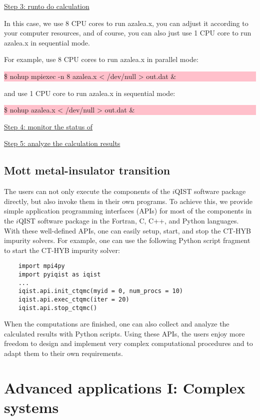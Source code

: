 \underline{Step 3: run\azalea to do calculation}

In this case, we use 8 CPU cores to run azalea.x, you can adjust it according to your computer resources, and of course, you can also just use 1 CPU core to run azalea.x in sequential mode.

For example, use 8 CPU cores to run azalea.x in parallel mode:

\noindent\colorbox{pink}{\parbox[r]{\linewidth}{\quad \$ nohup mpiexec -n 8 azalea.x < /dev/null > out.dat \&}}

and use 1 CPU core to run azalea.x in sequential mode:

\noindent\colorbox{pink}{\parbox[r]{\linewidth}{\quad \$ nohup azalea.x < /dev/null > out.dat \&}}

\underline{Step 4: monitor the status of\azalea}

\underline{Step 5: analyze the calculation results}


\subsection{Mott metal-insulator transition}
The users can not only execute the components of the $i$QIST software package directly, but also invoke them in their own programs. To achieve this, we provide simple application programming interfaces (APIs) for most of the components in the $i$QIST software package in the Fortran, C, C++, and Python languages. With these well-defined APIs, one can easily setup, start, and stop the CT-HYB impurity solvers. For example, one can use the following Python script fragment to start the CT-HYB impurity solver:
\begin{verbatim}
    import mpi4py
    import pyiqist as iqist
    ...
    iqist.api.init_ctqmc(myid = 0, num_procs = 10)
    iqist.api.exec_ctqmc(iter = 20)
    iqist.api.stop_ctqmc()
\end{verbatim}
When the computations are finished, one can also collect and analyze the calculated results with Python scripts. Using these APIs, the users enjoy more freedom to design and implement very complex computational procedures and to adapt them to their own requirements.

\section{Advanced applications I: Complex systems}

